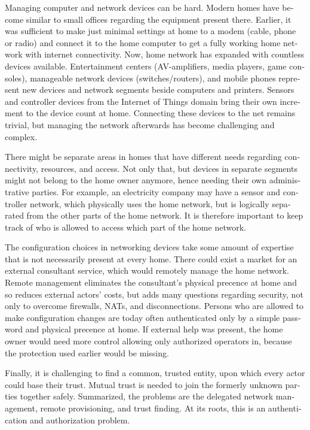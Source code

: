 \documentclass[12pt,a4paper,english]{tutthesis}
\begin{document}
\begin{otherlanguage}{english}
Managing computer and network devices can be hard.  Modern homes have
become similar to small offices regarding the equipment present there.
Earlier, it was sufficient to make just minimal settings at home to a
modem (cable, phone or radio) and connect it to the home computer to
get a fully working home network with internet connectivity.  Now, home
network has expanded with countless devices available. 
Entertainment centers (AV-amplifiers, media players, game consoles),
manageable network devices (switches/routers), and mobile phones
represent new devices and network segments beside computers and
printers. Sensors and controller devices from the Internet of Things
domain bring their own increment to the device count at home.
Connecting these devices to the net remains trivial, but managing the
network afterwards has become challenging and complex.

There might be separate areas in homes that have different needs regarding
connectivity, resources, and access. Not only that, but devices in
separate segments might not belong to the home owner anymore, hence needing
their own administrative parties. For example, an electricity company may
have a sensor and controller network, which physically uses the home network, but
is logically separated from the other parts of the home network. It is therefore
important to keep track of who is allowed to access which part of the
home network. 


The configuration choices in networking devices take some
amount of expertise that is not necessarily present at every
home. There could exist a market for an external consultant service, which would
remotely manage the home network.
Remote management eliminates the consultant's 
physical precence at home and so reduces external actors' costs, but adds many questions
regarding security, not only to overcome firewalls, NATs, and disconnections.
Persons who are allowed to make configuration changes are today
often authenticated only by a simple password and physical precence at home.
If external help was present, the home owner would need more 
control allowing only authorized operators in, because the 
protection used earlier would be missing.

Finally, it is challenging to find a common, 
trusted entity, upon which every actor could base their trust.
Mutual trust
 is needed to join the formerly unknown parties together
safely. 
Summarized, the problems are the delegated network management, remote
provisioning, and trust finding. At its roots, this is an authentication
and authorization problem.









\end{otherlanguage}
\end{document}
